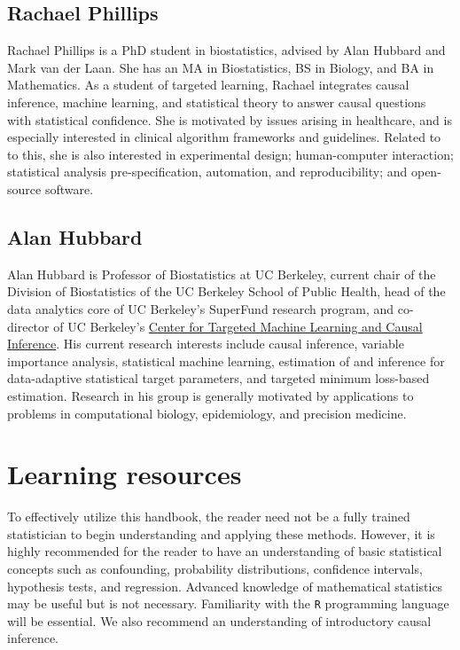\documentclass[
  12pt, krantz2,
]{krantz}
\newcommand{\passthrough}[1]{#1}
\newcommand{\1}{\mathbbm{1}}
\theoremstyle{definition}
\theoremstyle{definition}
\theoremstyle{definition}
\theoremstyle{definition}
\theoremstyle{remark}
\begin{document}
\hypertarget{rachael-phillips}{%
\subsection*{Rachael Phillips}\label{rachael-phillips}}


Rachael Phillips is a PhD student in biostatistics, advised by Alan Hubbard and
Mark van der Laan. She has an MA in Biostatistics, BS in Biology, and BA in
Mathematics. As a student of targeted learning, Rachael integrates causal
inference, machine learning, and statistical theory to answer causal questions
with statistical confidence. She is motivated by issues arising in healthcare,
and is especially interested in clinical algorithm frameworks and guidelines.
Related to to this, she is also interested in experimental design;
human-computer interaction; statistical analysis pre-specification, automation,
and reproducibility; and open-source software.

\hypertarget{alan-hubbard}{%
\subsection*{Alan Hubbard}\label{alan-hubbard}}


Alan Hubbard is Professor of Biostatistics at UC Berkeley, current chair of the
Division of Biostatistics of the UC Berkeley School of Public Health, head of
the data analytics core of UC Berkeley's SuperFund research program, and
co-director of UC Berkeley's \href{https://ctml.berkeley.edu/}{Center for Targeted Machine Learning and Causal
Inference}. His current research interests include
causal inference, variable importance analysis, statistical machine learning,
estimation of and inference for data-adaptive statistical target parameters, and
targeted minimum loss-based estimation. Research in his group is generally
motivated by applications to problems in computational biology, epidemiology,
and precision medicine.

\hypertarget{learning-resources}{%
\section*{Learning resources}\label{learning-resources}}


To effectively utilize this handbook, the reader need not be a fully trained
statistician to begin understanding and applying these methods. However, it is
highly recommended for the reader to have an understanding of basic statistical
concepts such as confounding, probability distributions, confidence intervals,
hypothesis tests, and regression. Advanced knowledge of mathematical statistics
may be useful but is not necessary. Familiarity with the \passthrough{\lstinline!R!} programming
language will be essential. We also recommend an understanding of introductory
causal inference.
\end{document}
